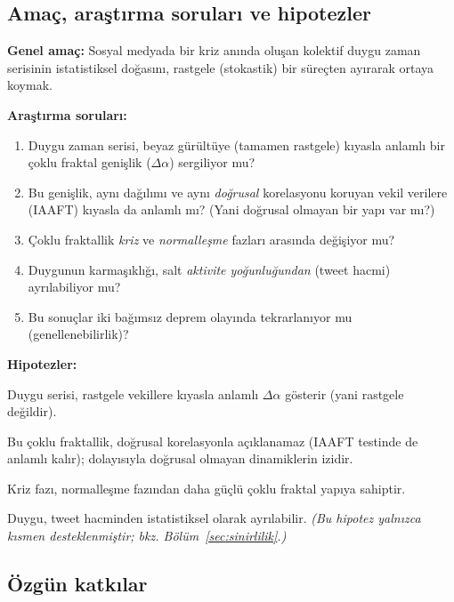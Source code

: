\documentclass[11pt,a4paper]{article}
\newcommand{\Dal}{\Delta\alpha}
\begin{document}
\subsection{Amaç, araştırma soruları ve hipotezler}

\textbf{Genel amaç:} Sosyal medyada bir kriz anında oluşan kolektif duygu
zaman serisinin istatistiksel doğasını, rastgele (stokastik) bir süreçten
ayırarak ortaya koymak.

\textbf{Araştırma soruları:}
\begin{enumerate}[leftmargin=1.6em,label=\textbf{AS\arabic*.}]
  \item Duygu zaman serisi, beyaz gürültüye (tamamen rastgele) kıyasla
        anlamlı bir çoklu fraktal genişlik ($\Dal$) sergiliyor mu?
  \item Bu genişlik, aynı dağılımı ve aynı \emph{doğrusal} korelasyonu koruyan
        vekil verilere (IAAFT) kıyasla da anlamlı mı? (Yani doğrusal olmayan
        bir yapı var mı?)
  \item Çoklu fraktallik \emph{kriz} ve \emph{normalleşme} fazları arasında
        değişiyor mu?
  \item Duygunun karmaşıklığı, salt \emph{aktivite yoğunluğundan} (tweet
        hacmi) ayrılabiliyor mu?
  \item Bu sonuçlar iki bağımsız deprem olayında tekrarlanıyor mu
        (genellenebilirlik)?
\end{enumerate}

\textbf{Hipotezler:}
\begin{description}[leftmargin=1.6em]
  \item[H1] Duygu serisi, rastgele vekillere kıyasla anlamlı $\Dal$ gösterir
        (yani rastgele değildir).
  \item[H2] Bu çoklu fraktallik, doğrusal korelasyonla açıklanamaz
        (IAAFT testinde de anlamlı kalır); dolayısıyla doğrusal olmayan
        dinamiklerin izidir.
  \item[H3] Kriz fazı, normalleşme fazından daha güçlü çoklu fraktal yapıya
        sahiptir.
  \item[H4] Duygu, tweet hacminden istatistiksel olarak ayrılabilir.
        \emph{(Bu hipotez yalnızca kısmen desteklenmiştir; bkz.
        Bölüm~\ref{sec:sinirlilik}.)}
\end{description}

\subsection{Özgün katkılar}
\end{document}

